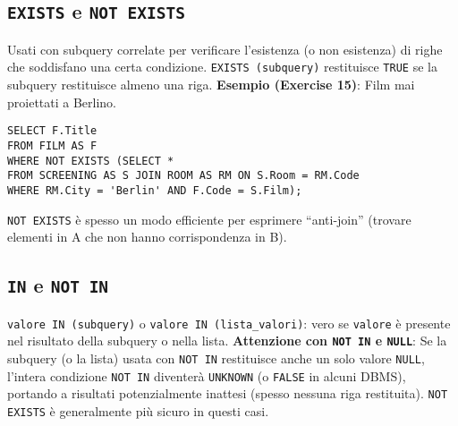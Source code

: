 \subsection{\texttt{EXISTS} e \texttt{NOT EXISTS}}
Usati con subquery correlate per verificare l'esistenza (o non esistenza) di righe che soddisfano una certa condizione.
\texttt{EXISTS (subquery)} restituisce \texttt{TRUE} se la subquery restituisce almeno una riga.
\textbf{Esempio (Exercise 15)}: Film mai proiettati a Berlino.
\begin{verbatim}
SELECT F.Title
FROM FILM AS F
WHERE NOT EXISTS (SELECT *
FROM SCREENING AS S JOIN ROOM AS RM ON S.Room = RM.Code
WHERE RM.City = 'Berlin' AND F.Code = S.Film);
\end{verbatim}
\texttt{NOT EXISTS} è spesso un modo efficiente per esprimere ``anti-join'' (trovare elementi in A che non hanno corrispondenza in B).

\subsection{\texttt{IN} e \texttt{NOT IN}}
\texttt{valore IN (subquery)} o \texttt{valore IN (lista\_valori)}: vero se \texttt{valore} è presente nel risultato della subquery o nella lista.
\textbf{Attenzione con \texttt{NOT IN} e \texttt{NULL}}: Se la subquery (o la lista) usata con \texttt{NOT IN} restituisce anche un solo valore \texttt{NULL}, l'intera condizione \texttt{NOT IN} diventerà \texttt{UNKNOWN} (o \texttt{FALSE} in alcuni DBMS), portando a risultati potenzialmente inattesi (spesso nessuna riga restituita). \texttt{NOT EXISTS} è generalmente più sicuro in questi casi.


